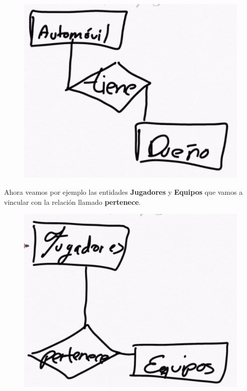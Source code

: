 \documentclass{article}
\begin{document}
\begin{figure}[h!]
    \centering
      \includegraphics[scale=0.35]{./Pictures/011_relacion_tiene.png}
\end{figure}

Ahora veamos por ejemplo las entidades \textbf{Jugadores} y \textbf{Equipos}
que vamos a vincular con la relación llamado \textbf{pertenece}.

\begin{figure}[h!]
    \centering
      \includegraphics[scale=0.35]{./Pictures/011_relacion_pertenece.png}
\end{figure}
\end{document}
